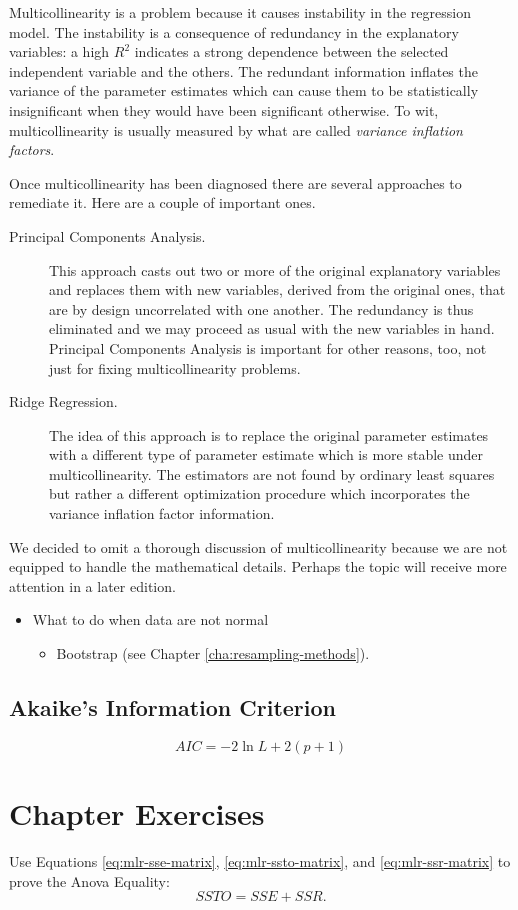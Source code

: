 \documentclass[captions=tableheading]{scrbook}
\begin{document}
Multicollinearity is a problem because it causes instability in the regression model. The instability is a consequence of redundancy in the explanatory variables: a high $R^{2}$ indicates a strong dependence between the selected independent variable and the others. The redundant information inflates the variance of the parameter estimates which can cause them to be statistically insignificant when they would have been significant otherwise. To wit, multicollinearity is usually measured by what are called \emph{variance inflation factors}.

Once multicollinearity has been diagnosed there are several approaches to remediate it. Here are a couple of important ones. 

\begin{description}
\item[Principal Components Analysis.] This approach casts out two or more of the original explanatory variables and replaces them with new variables, derived from the original ones, that are by design uncorrelated with one another. The redundancy is thus eliminated and we may proceed as usual with the new variables in hand. Principal Components Analysis is important for other reasons, too, not just for fixing multicollinearity problems.
\item[Ridge Regression.] The idea of this approach is to replace the original parameter estimates with a different type of parameter estimate which is more stable under multicollinearity. The estimators are not found by ordinary least squares but rather a different optimization procedure which incorporates the variance inflation factor information.
\end{description}

We decided to omit a thorough discussion of multicollinearity because we are not equipped to handle the mathematical details. Perhaps the topic will receive more attention in a later edition.

\begin{itemize}
\item What to do when data are not normal
\begin{itemize}
\item Bootstrap (see Chapter \ref{cha:resampling-methods}).
\end{itemize}
\end{itemize}
\subsection{Akaike's Information Criterion}
\label{sec-1-9-4}


\[
AIC=-2\ln L+2(p+1)
\]

\newpage{}
\section{Chapter Exercises}
\label{sec-1-10}


\setcounter{thm}{0}

\begin{xca}
\label{xca:anova-equality}
Use Equations \ref{eq:mlr-sse-matrix}, \ref{eq:mlr-ssto-matrix}, and \ref{eq:mlr-ssr-matrix} to prove the Anova Equality:
\[
SSTO=SSE+SSR.
\]
\end{xca}
\end{document}
